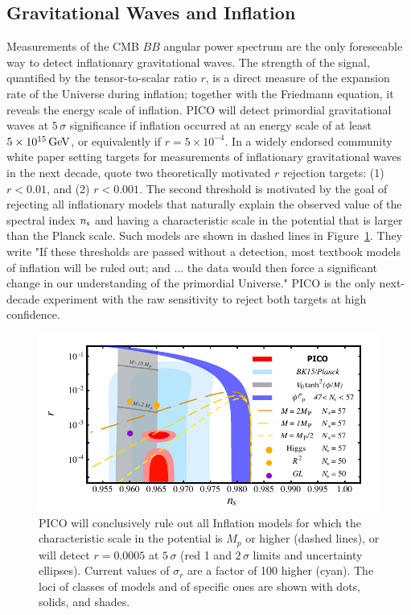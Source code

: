\documentclass[PICOAPC.tex]{subfiles}
\begin{document}
\subsection{Gravitational Waves and Inflation}
\label{sec:inflation}

Measurements of the \ac{CMB} $BB$ angular power spectrum are the only foreseeable way to detect  inflationary gravitational waves. The strength of the signal, quantified by the tensor-to-scalar ratio $r$, is a direct measure of the expansion rate of the Universe during inflation; together with the Friedmann equation, it reveals the energy scale of inflation. PICO will detect primordial gravitational waves at $5\,\sigma$ significance if inflation occurred at an energy scale of at least $5\times 10^{15}\,\rm{GeV}$, or equivalently if $r= 5\times 10^{-4}$.  In a widely endorsed community white paper setting targets for measurements of inflationary gravitational waves in the next decade, \citet{Shandera_etal} quote two theoretically motivated $r$ rejection targets: (1) $r < 0.01$, and (2) $r < 0.001$. The second threshold is motivated by the goal of rejecting all inflationary models that naturally explain the observed value of the spectral index $n_{\rm s}$ and having a characteristic scale in the potential that is larger than the Planck scale. Such models are shown in dashed lines in Figure~\ref{fig:nsr}.  They write "If these thresholds are passed without a detection, most textbook models of inflation will be ruled out; and ... the data would then force a significant change in our understanding of the primordial Universe." PICO is the only next-decade experiment with the raw sensitivity to reject both targets at high confidence. 

\begin{figure}[!thb]
\vspace{-.1in}
\hspace{-0.13in}
\parbox{4.4in}{\centerline{
\includegraphics[width=4.5in]{figures/nsrlabeledrp0005_PICOv6.pdf} } }
\parbox{2.1in}{
\caption{\captiontext  PICO will conclusively rule out all Inflation models for which the characteristic scale in the potential is $M_{p}$ or higher (dashed lines), or will detect $r=0.0005$ at $5\, \sigma$ (red 1 and $2\,\sigma$ limits and uncertainty ellipses). Current values of $\sigma_{r}$ are a factor of 100 higher (cyan). 
The loci of classes of models and of specific ones are shown with dots, solids, and shades. }
\label{fig:nsr}}
\vspace{-0.16in}
\end{figure}
\end{document}
